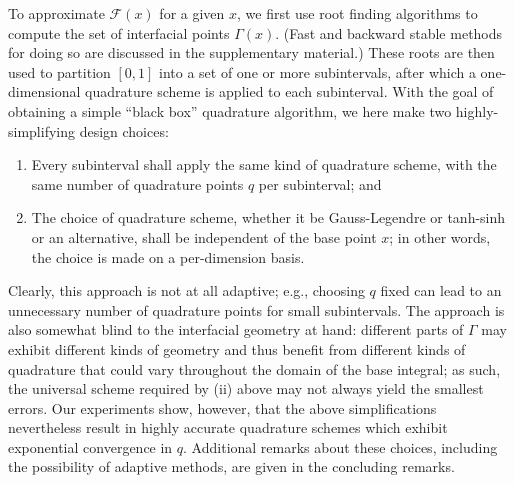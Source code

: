 \documentclass[onefignum,onetabnum,onealgnum,oneeqnum]{siamart190516}
\begin{document}
To approximate ${\mathcal F}(x)$ for a given $x$, we first use root finding algorithms to compute the set of interfacial points $\Gamma(x)$. (Fast and backward stable methods for doing so are discussed in the supplementary material.) These roots are then used to partition $[0,1]$ into a set of one or more subintervals, after which a one-dimensional quadrature scheme is applied to each subinterval. With the goal of obtaining a simple ``black box'' quadrature algorithm, we here make two highly-simplifying design choices:
\begin{enumerate}[label=(\roman*)]
\item Every subinterval shall apply the same kind of quadrature scheme, with the same number of quadrature points $q$ per subinterval; and 
\item The choice of quadrature scheme, whether it be Gauss-Legendre or tanh-sinh or an alternative, shall be independent of the base point $x$; in other words, the choice is made on a per-dimension basis. %
\end{enumerate}
Clearly, this approach is not at all adaptive; e.g., choosing $q$ fixed can lead to an unnecessary number of quadrature points for small subintervals. The approach is also somewhat blind to the interfacial geometry at hand: different parts of $\Gamma$ may exhibit different kinds of geometry and thus benefit from different kinds of quadrature that could vary throughout the domain of the base integral; as such, the universal scheme required by (ii) above may not always yield the smallest errors. Our experiments show, however, that the above simplifications nevertheless result in highly accurate quadrature schemes which exhibit exponential convergence in $q$. Additional remarks about these choices, including the possibility of adaptive methods, are given in the concluding remarks.



%
\end{document}
